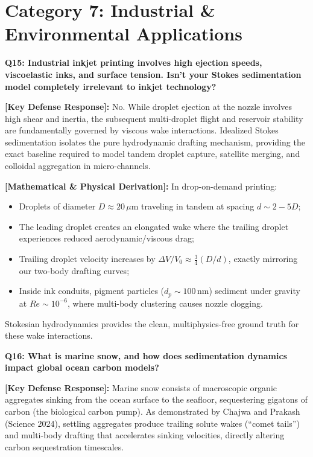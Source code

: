 \documentclass[11pt,a4paper]{article}
\newcommand{\question}[2]{
    \vspace{0.4cm}
    \noindent\colorbox{blue!10}{\parbox{\dimexpr\textwidth-2\fboxsep\relax}{
        \textbf{#1: #2}
    }}
    \vspace{0.2cm}
}
\newcommand{\shortanswer}[1]{
    \noindent\textbf{\textcolor{green!50!black}{[Key Defense Response]:}} #1
    \vspace{0.2cm}
}
\newcommand{\deepdetails}[1]{
    \noindent\textbf{\textcolor{blue!60!black}{[Mathematical \& Physical Derivation]:}} #1
    \vspace{0.2cm}
}
\begin{document}
\section{Category 7: Industrial & Environmental Applications}

\question{Q15}{Industrial inkjet printing involves high ejection speeds, viscoelastic inks, and surface tension. Isn't your Stokes sedimentation model completely irrelevant to inkjet technology?}

\shortanswer{No. While droplet ejection at the nozzle involves high shear and inertia, the subsequent multi-droplet flight and reservoir stability are fundamentally governed by viscous wake interactions. Idealized Stokes sedimentation isolates the pure hydrodynamic drafting mechanism, providing the exact baseline required to model tandem droplet capture, satellite merging, and colloidal aggregation in micro-channels.}

\deepdetails{
In drop-on-demand printing:
\begin{itemize}
    \item Droplets of diameter $D \approx 20\,\mu\text{m}$ traveling in tandem at spacing $d \sim 2 - 5 D$;
    \item The leading droplet creates an elongated wake where the trailing droplet experiences reduced aerodynamic/viscous drag;
    \item Trailing droplet velocity increases by $\Delta V / V_0 \approx \frac{3}{4}(D/d)$, exactly mirroring our two-body drafting curves;
    \item Inside ink conduits, pigment particles ($d_p \sim 100\,\text{nm}$) sediment under gravity at $Re \sim 10^{-6}$, where multi-body clustering causes nozzle clogging.
\end{itemize}
Stokesian hydrodynamics provides the clean, multiphysics-free ground truth for these wake interactions.
}

\vspace{0.4cm}
\question{Q16}{What is marine snow, and how does sedimentation dynamics impact global ocean carbon models?}

\shortanswer{Marine snow consists of macroscopic organic aggregates sinking from the ocean surface to the seafloor, sequestering gigatons of carbon (the biological carbon pump). As demonstrated by Chajwa and Prakash (Science 2024), settling aggregates produce trailing solute wakes (``comet tails'') and multi-body drafting that accelerates sinking velocities, directly altering carbon sequestration timescales.}
\end{document}
